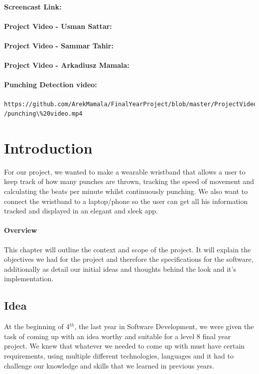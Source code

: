 \documentclass[a4paper,12pt]{report}
\begin{document}
\subsubsection{Screencast Link:}
\subsubsection{Project Video - Usman Sattar: }
\subsubsection{Project Video - Sammar Tahir: }
\subsubsection{Project Video - Arkadiusz Mamala: }
\subsubsection{Punching Detection video: }\begin{lstlisting}
https://github.com/ArekMamala/FinalYearProject/blob/master/ProjectVideos
/punching\%20video.mp4
\end{lstlisting}
\body

\chapter{Introduction}
For our project, we wanted to make a wearable wristband that allows a user to keep track of how many punches are thrown, tracking the speed of movement and calculating the beats per minute whilst continuously punching. We also want to connect the wristband to a laptop/phone so the user can get all his information tracked and displayed in an elegant and sleek app.

\subsubsection{Overview}
This chapter will outline the context and scope of the project. It
will explain the objectives we had for the project and therefore the specifications for the software, additionally as detail our initial ideas and thoughts
behind the look and it’s implementation.

\section{Idea}
At the beginning of 4$^{th}$, the last year in Software Development, we were given the task of coming up with an idea worthy and suitable for a level 8 final year project. We knew that whatever we needed to come up with must have certain requirements, using multiple different technologies, languages and it had to challenge our knowledge and skills that we learned in previous years.
\end{document}
